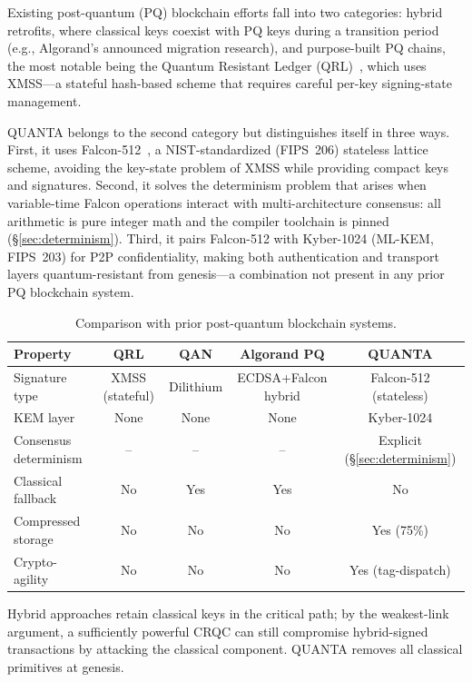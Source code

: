 \documentclass[11pt,a4paper]{article}
\begin{document}
Existing post-quantum (PQ) blockchain efforts fall into two categories:
hybrid retrofits, where classical keys coexist with PQ keys during a
transition period (e.g., Algorand's announced migration research), and
purpose-built PQ chains, the most notable being the Quantum Resistant
Ledger (QRL)~\cite{hulsing2018}, which uses XMSS---a stateful hash-based
scheme that requires careful per-key signing-state management.

QUANTA belongs to the second category but distinguishes itself in three
ways. First, it uses Falcon-512~\cite{falcon2020}, a NIST-standardized
(FIPS~206) stateless lattice scheme, avoiding the key-state problem of XMSS
while providing compact keys and signatures. Second, it solves the
determinism problem that arises when variable-time Falcon operations interact
with multi-architecture consensus: all arithmetic is pure integer math and
the compiler toolchain is pinned (\S\ref{sec:determinism}). Third, it pairs
Falcon-512 with Kyber-1024 (ML-KEM, FIPS~203) for P2P confidentiality,
making both authentication and transport layers quantum-resistant from
genesis---a combination not present in any prior PQ blockchain system.

\begin{table}[h]
\centering
\small
\begin{tabular}{@{}lcccc@{}}
\toprule
\textbf{Property} & \textbf{QRL} & \textbf{QAN} & \textbf{Algorand PQ} & \textbf{QUANTA} \\
\midrule
Signature type    & XMSS (stateful) & Dilithium & ECDSA+Falcon hybrid & Falcon-512 (stateless) \\
KEM layer         & None & None & None & Kyber-1024 \\
Consensus determinism & -- & -- & -- & Explicit (\S\ref{sec:determinism}) \\
Classical fallback & No  & Yes  & Yes  & No \\
Compressed storage & No  & No   & No   & Yes (75\%) \\
Crypto-agility    & No  & No   & No   & Yes (tag-dispatch) \\
\bottomrule
\end{tabular}
\caption{Comparison with prior post-quantum blockchain systems.}
\label{tab:comparison}
\end{table}

Hybrid approaches retain classical keys in the critical path; by the
weakest-link argument, a sufficiently powerful CRQC can still compromise
hybrid-signed transactions by attacking the classical component. QUANTA
removes all classical primitives at genesis.
\end{document}
